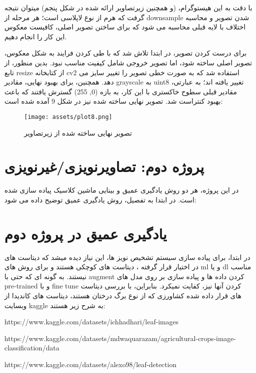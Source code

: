 \documentclass[a4paper,12pt]{article}
\begin{document}
با دقت به این هیستوگرام، (و همچنین زیرتصاویر ارائه شده در شکل پنجم) میتوان نتیجه گرفت که هرم از نوع لاپلاسی است؛ هر مرحله از downsample شدن تصویر و محاسبه اختلاف با لایه قبلی محاسبه می شود که برای ساختن تصویر اصلی، کافیست معکوس این کار را انجام دهیم.


\pagebreak

برای درست کردن تصویر، در ابتدا تلاش شد که با طی کردن فرایند به شکل معکوس، تصویر اصلی ساخته شود، اما تصویر خروجی شامل کیفیت مناسب نبود. بدین منظور، از تابع resize از کتابخانه cv2 استفاده شد که به صورت خطی تصویر را تغییر سایز می دهد. همچنین، برای بهبود نهایی، مقادیر grayscale به uint8 تغییر یافته اند؛ به عبارتی، مقادیر قبلی سطوح خاکستری با این کار، به بازه (0, 255) گسترش یافتند که باعث بهبود کنتراست شد.
تصویر نهایی ساخته شده نیز در شکل 9 آمده شده است:

\begin{figure}[h]
	\centering
	\texttt{[image: assets/plot8.png]}
	\caption{\textcolor{CustomAccent}{تصویر نهایی ساخته شده از زیرتصاویر}}
\end{figure}


\pagebreak
\section{پروژه دوم: تصاویرنویزی/غیرنویزی}
در این پروژه، هر دو روش یادگیری عمیق و بینایی ماشین کلاسیک پیاده سازی شده است. در ابتدا به تفصیل، روش یادگیری عمیق توضیح داده می شود:

\section{یادگیری عمیق در پروژه دوم}


در ابتدا، برای پیاده سازی سیستم تشخیص نویز ها، این نیاز دیده میشد که دیتاست های در اختیار قرار گرفته ، دیتاست های کوچکی هستند و برای روش های ml و یا dl مناسب نیستند. به گونه ای که حتی با augment کردن داده ها و پیاده سازی بر روی مدل های pre-trained و با fine tune کردن آنها نیز، کفایت نمیکرد.  بنابراین، با بررسی دیتاست های قرار داده شده کشاورزی که از نوع برگ درختان هستند، دیتاست های کاندیدا از وبسایت kaggle به شرح زیر هستند:
\begin{enumerate}
\end{enumerate}
\end{document}
